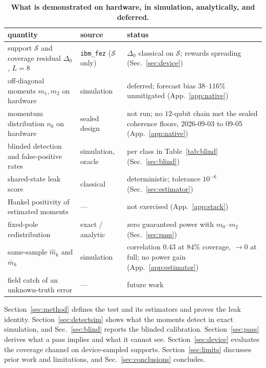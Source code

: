 \documentclass[submission, PhysCore]{SciPost}
\begin{document}
\begin{table}[tbp]
\caption{\textbf{What is demonstrated on hardware, in simulation, analytically, and deferred.}}
\label{tab:scope}
\small
\begin{tabular}{p{}p{}p{}}
\toprule
quantity & source & status \tabularnewline
\midrule
\raggedright support $\mathcal S$ and coverage residual $\Delta_0$, $L=8$ & \raggedright\texttt{ibm\_fez} ($\mathcal S$ only) & \raggedright $\Delta_0$ classical on $\mathcal S$; rewards spreading (Sec.~\ref{sec:device}) \tabularnewline\addlinespace[2pt]
\raggedright off-diagonal moments $m_1,m_2$ on hardware & \raggedright simulation & \raggedright deferred; forecast bias $38$--$116\%$ unmitigated (App.~\ref{app:native}) \tabularnewline\addlinespace[2pt]
\raggedright momentum distribution $n_k$ on hardware & \raggedright sealed design & \raggedright not run; no $12$-qubit chain met the sealed coherence floors, 2026-09-03 to 09-05 (App.~\ref{app:native}) \tabularnewline\addlinespace[2pt]
\raggedright blinded detection and false-positive rates & \raggedright simulation, oracle & \raggedright per class in Table~\ref{tab:blind} (Sec.~\ref{sec:blind}) \tabularnewline\addlinespace[2pt]
\raggedright shared-state leak score & \raggedright classical & \raggedright deterministic; tolerance $10^{-6}$ (Sec.~\ref{sec:estimator}) \tabularnewline\addlinespace[2pt]
\raggedright Hankel positivity of estimated moments & \raggedright --- & \raggedright not exercised (App.~\ref{app:stack}) \tabularnewline\addlinespace[2pt]
\raggedright fixed-pole redistribution & \raggedright exact / analytic & \raggedright zero guaranteed power with $m_0$--$m_2$ (Sec.~\ref{sec:pass}) \tabularnewline\addlinespace[2pt]
\raggedright same-sample $\widehat m_k$ and $\bar m_k$ & \raggedright simulation & \raggedright correlation $0.43$ at $84\%$ coverage, ${\to}0$ at full; no power gain (App.~\ref{app:estimator}) \tabularnewline\addlinespace[2pt]
\raggedright field catch of an unknown-truth error & \raggedright --- & \raggedright future work \tabularnewline
\bottomrule
\end{tabular}
\end{table}

Section~\ref{sec:method} defines the test and its estimators and proves the leak identity. Section~\ref{sec:detectsim} shows what the moments detect in exact simulation, and Sec.~\ref{sec:blind} reports the blinded calibration. Section~\ref{sec:pass} derives what a pass implies and what it cannot see. Section~\ref{sec:device} evaluates the coverage channel on device-sampled supports. Section~\ref{sec:limits} discusses prior work and limitations, and Sec.~\ref{sec:conclusions} concludes.
\end{document}
